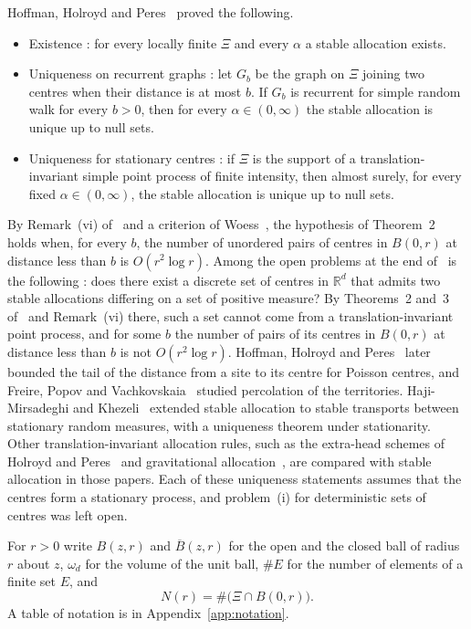 \documentclass[11pt]{amsart}
\theoremstyle{remark}
\numberwithin{equation}{section}
\newcommand{\R}{\mathbb{R}}
\begin{document}
Hoffman, Holroyd and Peres~\cite{HHP} proved the following.
\begin{itemize}
\item Existence \cite[Theorem~1]{HHP}: for every locally finite $\Xi$ and every $\alpha$ a stable allocation exists.
\item Uniqueness on recurrent graphs \cite[Theorem~2]{HHP}: let $G_b$ be the graph on $\Xi$ joining two centres when their distance is at most $b$. If $G_b$ is recurrent for simple random walk for every $b>0$, then for every $\alpha\in(0,\infty)$ the stable allocation is unique up to null sets.
\item Uniqueness for stationary centres \cite[Theorem~3]{HHP}: if $\Xi$ is the support of a translation-invariant simple point process of finite intensity, then almost surely, for every fixed $\alpha\in(0,\infty)$, the stable allocation is unique up to null sets.
\end{itemize}
By Remark~(vi) of~\cite{HHP} and a criterion of Woess~\cite[Corollary~3.52]{Woess}, the hypothesis of Theorem~2 holds when, for every $b$, the number of unordered pairs of centres in $B(0,r)$ at distance less than $b$ is $O(r^2\log r)$. Among the open problems at the end of~\cite{HHP} is the following \cite[Section~7, problem~(i)]{HHP}: does there exist a discrete set of centres in $\R^d$ that admits two stable allocations differing on a set of positive measure? By Theorems~2 and~3 of~\cite{HHP} and Remark~(vi) there, such a set cannot come from a translation-invariant point process, and for some $b$ the number of pairs of its centres in $B(0,r)$ at distance less than $b$ is not $O(r^2\log r)$. Hoffman, Holroyd and Peres~\cite{HHP09} later bounded the tail of the distance from a site to its centre for Poisson centres, and Freire, Popov and Vachkovskaia~\cite{FPV} studied percolation of the territories. Haji-Mirsadeghi and Khezeli~\cite{HMK} extended stable allocation to stable transports between stationary random measures, with a uniqueness theorem under stationarity. Other translation-invariant allocation rules, such as the extra-head schemes of Holroyd and Peres~\cite{HP05} and gravitational allocation~\cite{CPPR}, are compared with stable allocation in those papers. Each of these uniqueness statements assumes that the centres form a stationary process, and problem~(i) for deterministic sets of centres was left open.

For $r>0$ write $B(z,r)$ and $\overline B(z,r)$ for the open and the closed ball of radius $r$ about $z$, $\omega_d$ for the volume of the unit ball, $\#E$ for the number of elements of a finite set $E$, and
\[
N(r)=\#\bigl(\Xi\cap B(0,r)\bigr).
\]
A table of notation is in Appendix~\ref{app:notation}.
\end{document}
